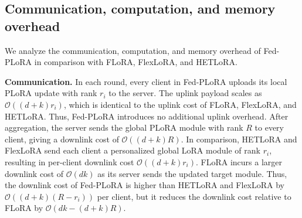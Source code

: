 \documentclass{article} %
\begin{document}
{
\vspace{-6pt}
\subsection{Communication, computation, and memory overhead}

We analyze the communication, computation, and memory overhead of Fed-PLoRA in comparison with FLoRA, FlexLoRA, and HETLoRA. 

\textbf{Communication.} In each round, every client in Fed-PLoRA uploads its local PLoRA update with rank $r_i$ to the server. The uplink payload scales as
$\mathcal{O}((d + k) r_i)$, which is identical to the uplink cost of FLoRA, FlexLoRA, and HETLoRA. Thus, Fed-PLoRA introduces no additional uplink overhead. 
After aggregation, the server sends the global PLoRA module with rank $R$ to every client, giving a downlink cost of $\mathcal{O}((d+k)R)$. In comparison, HETLoRA and FlexLoRA send each client a personalized global LoRA module of rank $r_i$, resulting in per-client downlink cost $\mathcal{O}((d+k)r_i)$. FLoRA incurs a larger downlink cost of $\mathcal{O}(dk)$ as its server sends the updated target module. Thus, the downlink cost of Fed-PLoRA is higher than HETLoRA and FlexLoRA by $\mathcal{O}((d+k)(R - r_i))$ per client, but it reduces the downlink cost relative to FLoRA by $\mathcal{O}(dk - (d+k) R)$. %



}
\end{document}
